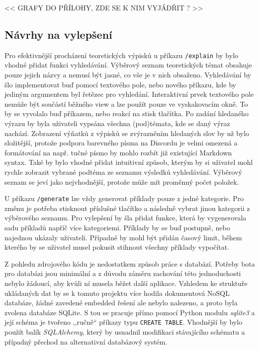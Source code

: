 \documentclass[FM]{tulthesis}
\begin{document}
	<< GRAFY DO PŘÍLOHY, ZDE SE K NIM VYJÁDŘIT ? >>
	
	\subsection{Návrhy na vylepšení}
	
	Pro efektivnější procházení teoretických výpisků u příkazu \verb|/explain| by bylo vhodné přidat funkci vyhledávání. Výběrový seznam teoretických témat obsahuje pouze jejich názvy a nemusí být jasné, co vše je v nich obsaženo. Vyhledávání by šlo implementovat buď pomocí textového pole, nebo nového příkazu, kde by jediným argumentem byl řetězec pro vyhledání. Interaktivní prvek textového pole nemůže být součástí běžného view a lze použít pouze ve vyskakovacím okně. To by se vyvolalo buď příkazem, nebo reakcí na stisk tlačítka. Po zadání hledaného výrazu by byla uživateli vypsána všechna (pod)témata, kde se daný výraz nachází. Zobrazení výňatků z výpisků se zvýrazněním hledaných slov by už bylo složitější, protože podpora barevného písma na Discordu je velmi omezená a formátování na např. tučné písmo by mohlo rozbít již existující Markdown syntax. Také by bylo vhodné přidat intuitivní způsob, kterým by si uživatel mohl rychle zobrazit vybrané podtéma ze seznamu výsledků vyhledávání. Výběrový seznam se jeví jako nejvhodnější, protože může mít proměnný počet položek.
	
	U příkazu \verb|/generate| lze vždy generovat příklady pouze z jedné kategorie. Pro změnu je potřeba stisknout příslušné tlačítko a následně vybrat jinou kategorii z výběrového seznamu. Pro vylepšení by šla přidat funkce, která by vygenerovala sadu příkladů napříč více kategoriemi. Příklady by se buď postupně, nebo najednou ukázaly uživateli. Případně by mohl být přidán časový limit, během kterého by se uživatel musel pokusit stihnout všechny příklady vypočítat.
	
	Z pohledu zdrojového kódu je nedostatkem způsob práce s databází. Potřeby bota pro databázi jsou minimální a z důvodu záměru zachování této jednoduchosti nebylo žádoucí, aby kvůli ní musela běžet další aplikace. Vzhledem ke struktuře ukládaných dat by se k tomuto projektu více hodila dokumentová NoSQL databáze, žádné zavedené embedded řešení ale nebylo nalezeno, a proto byla zvolena databáze SQLite. S tou se pracuje přímo pomocí Python modulu \textit{sqlite3} a její schéma je tvořeno ,,ručně`` příkazy typu \verb|CREATE TABLE|. Vhodnější by bylo použít balík \textit{SQLAlchemy}, který by usnadnil modifikaci stávajícího schématu a případný přechod na alternativní databázový systém.
	
\end{document}
